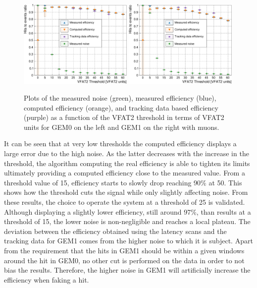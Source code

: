       \begin{figure}[h!]
        \centering
        \includegraphics[width=0.49\textwidth]{img/plots/cEfficiency_Threshold_GEM0-crop}
        \includegraphics[width=0.49\textwidth]{img/plots/cEfficiency_Threshold_GEM1-crop}
        \caption{Plots of the measured noise (green), measured efficiency (blue), computed efficiency (orange), and tracking data based efficiency (purple) as a function of the VFAT2 threshold in terms of VFAT2 units for GEM0 on the left and GEM1 on the right with muons.}
        \label{fig:II-3-data-eff-threshold}
      \end{figure}

      It can be seen that at very low thresholds the computed efficiency displays a large error due to the high noise. As the latter decreases with the increase in the threshold, the algorithm computing the real efficiency is able to tighten its limits ultimately providing a computed efficiency close to the measured value. From a threshold value of 15, efficiency starts to slowly drop reaching 90\% at 50. This shows how the threshold cuts the signal while only slightly affecting noise. From these results, the choice to operate the system at a threshold of 25 is validated. Although displaying a slightly lower efficiency, still around 97\%, than results at a threshold of 15, the lower noise is non-negligible and reaches a local plateau. The deviation between the efficiency obtained using the latency scans and the tracking data for GEM1 comes from the higher noise to which it is subject. Apart from the requirement that the hits in GEM1 should be within a given windows around the hit in GEM0, no other cut is performed on the data in order to not bias the results. Therefore, the higher noise in GEM1 will artificially increase the efficiency when faking a hit.

